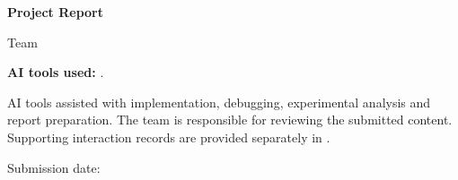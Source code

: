 \begin{titlepage}
\centering
\vspace*{12mm}
{\Large\University\par}
\vspace{6mm}
{\large\Course\par}
\AcademicTerm\par
\vspace{22mm}
{\LARGE\bfseries Project Report\par}
\vspace{8mm}
{\Large\ReportTitle\par}
\vspace{12mm}
{\Large Team \TeamNumber\par}
\vspace{10mm}
\Desmond\par
\Xincheng\par
\Hikaru\par
\Kelvin\par
\vfill
\begin{minipage}{0.92\textwidth}
\textbf{AI tools used:} \AITools.

AI tools assisted with implementation, debugging, experimental analysis and
report preparation. The team is responsible for reviewing the submitted content.
Supporting interaction records are provided separately in .
\end{minipage}
\vspace{10mm}
\par Submission date: \SubmissionDate
\end{titlepage}
\setcounter{page}{2}
